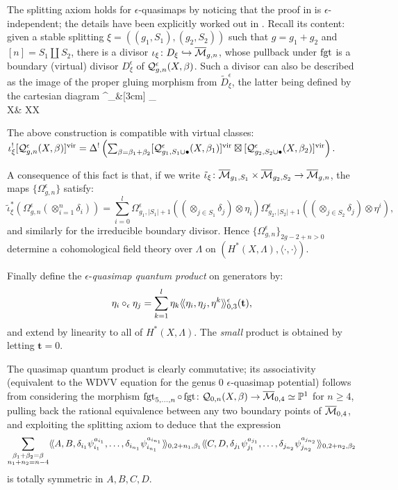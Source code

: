 The splitting axiom holds for $\epsilon$-quasimaps by noticing that the proof in \cite{Behrend} is $\epsilon$-independent; the details have been explicitly worked out in \cite[Appendix B.3]{BN}. Recall its content: given a stable splitting $\xi=((g_1,S_1),(g_2,S_2))$ such that $g=g_1+g_2$ and $[n]=S_1\coprod S_2$, there is a divisor $\iota_\xi\colon D_\xi\hookrightarrow\overline{\mathcal{M}}_{g,n}$, whose pullback under $\operatorname{fgt}$ is a boundary (virtual) divisor $D^\epsilon_\xi$ of $\mathcal{Q}^{\epsilon}_{g,n}(X,\beta)$. Such a divisor can also be described as the image of the proper gluing morphism from $\tilde{D}^\epsilon_\xi$, the latter being defined by the cartesian diagram
\bcd
{}^\epsilon_\xi \ar[d]\ar[r] &[3cm] \coprod_{}\times {} \\
X & X\times X
\ecd

\begin{lem} The above construction is compatible with virtual classes:
 $\iota_\xi^![\mathcal{Q}^{\epsilon}_{g,n}(X,\beta)]^{\mathrm{vir}}=\Delta^!\left(\sum_{\beta=\beta_1+\beta_2}[\mathcal{Q}^{\epsilon}_{g_1,S_1\cup\bullet}(X,\beta_1)]^{\mathrm{vir}}\boxtimes[\mathcal{Q}^{\epsilon}_{g_2,S_2\cup\bullet}(X,\beta_2)]^{\mathrm{vir}}\right).$
\end{lem}

A consequence of this fact is that, if we write $\tilde{\iota}_\xi\colon \overline{\mathcal{M}}_{g_1,S_1}\times \overline{\mathcal{M}}_{g_2,S_2}\rightarrow \overline{\mathcal{M}}_{g,n}$, the maps $\{\Omega^\epsilon_{g,n}\}$ satisfy:
\[\tilde{\iota}_\xi^*(\Omega^\epsilon_{g,n}(\otimes_{i=1}^n\delta_i))=\sum_{i=0}^l\Omega^\epsilon_{g_1,\lvert S_1\rvert+1}((\otimes_{j\in S_1}\delta_j)\otimes \eta_i)\Omega^\epsilon_{g_2,\lvert S_2\rvert+1}((\otimes_{j\in S_2}\delta_j)\otimes \eta^i),\]
and similarly for the irreducible boundary divisor. Hence $\{\Omega^\epsilon_{g,n}\}_{2g-2+n>0}$ determine a cohomological field theory over $\Lambda$ on $(H^*(X,\Lambda),\langle\cdot,\cdot\rangle)$.

Finally define the $\epsilon$-\emph{quasimap quantum product} on generators by:
\[\eta_i\circ_\epsilon \eta_j=\sum_{k=1}^l\eta_k\langle\!\langle\eta_i,\eta_j,\eta^k\rangle\!\rangle^\epsilon_{0,3}(\mathbf{t}),\]
and extend by linearity to all of $H^*(X,\Lambda)$. The \emph{small} product is obtained by letting $\mathbf t=0$.

\begin{rmk}
 The quasimap quantum product is clearly commutative; its associativity (equivalent to the WDVV equation for the genus $0$ $\epsilon$-quasimap potential) follows from considering the morphism $\operatorname{fgt}_{5,\ldots,n}\circ\operatorname{fgt}\colon \mathcal{Q}_{0,n}(X,\beta)\rightarrow\overline{\mathcal{M}}_{0,4}\simeq\mathbb P^1$ for $n\geq 4$, pulling back the rational equivalence between any two boundary points of $\overline{\mathcal{M}}_{0,4}$, and exploiting the splitting axiom to deduce that the expression
 \[\sum_{\substack{\beta_1+\beta_2=\beta \\ n_1+n_2=n-4}}\langle\!\langle A,B,\delta_{i_1}\psi_{i_1}^{a_{i_1}},\ldots,\delta_{i_{n_1}}\psi_{i_{n_1}}^{a_{i_{n_1}}}\rangle\!\rangle_{0,2+n_1,\beta_1}\langle\!\langle C,D,\delta_{j_1}\psi_{j_1}^{a_{j_1}},\ldots,\delta_{j_{n_2}}\psi_{j_{n_2}}^{a_{j_{n_2}}}\rangle\!\rangle_{0,2+n_2,\beta_2}\]
 is totally symmetric in $A,B,C,D$.
\end{rmk}
